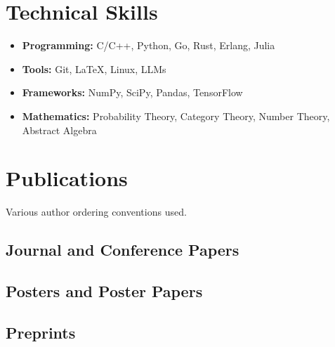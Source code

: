 \documentclass[10pt]{article}
\begin{document}
\section*{Technical Skills}
\begin{itemize}
\item \textbf{Programming:} C/C++, Python, Go, Rust, Erlang, Julia
\item \textbf{Tools:} Git, \LaTeX, Linux, LLMs 
\item\textbf{Frameworks:} NumPy, SciPy, Pandas, TensorFlow
\item \textbf{Mathematics:} Probability Theory, Category Theory, Number Theory, Abstract Algebra 
\end{itemize}

\section*{Publications}

Various author ordering conventions used. 

\subsection*{Journal and Conference Papers}

\printbibliography[heading=none, keyword=conf]

\subsection*{Posters and Poster Papers}

\printbibliography[heading=none, keyword=poster]

\subsection*{Preprints}

\printbibliography[heading=none, keyword=pre]
\end{document}
